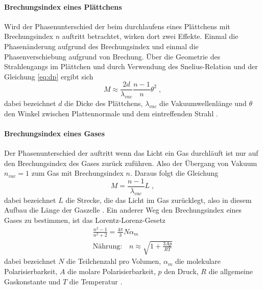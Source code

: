 \paragraph{Brechungsindex eines Plättchens}
Wird der Phasenunterschied der beim durchlaufens eines Plättchens mit Brechungsindex $n$ auftritt betrachtet,
wirken dort zwei Effekte. Einmal die Phasenänderung aufgrund des Brechungsindex und einmal die
Phasenverschiebung aufgrund von Brechung. Über die Geometrie des Strahlengangs im Plättchen und durch
Verwendung des Snelius-Relation und der Gleichung \eqref{eq:dp} ergibt sich
\begin{equation}
M \approx \frac{2d}{\lambda_{vac}} \frac{n-1}{n} \theta^2 \; ,
\label{eq:pM}
\end{equation}
dabei bezeichnet $d$ die Dicke des Plättchens, $\lambda_{vac}$ die Vakuumwellenlänge und $\theta$ den
Winkel zwischen Plattennormale und dem eintreffenden Strahl \cite{Anleitung}.
\paragraph{Brechungsindex eines Gases}
Der Phasenunterschied der auftritt wenn das Licht ein Gas durchläuft ist nur auf den Brechungsindex des
Gases zurück zuführen. Also der Übergang von Vakuum $n_{vac}= 1$ zum Gas mit Brechungsindex $n$. Daraus folgt
die Gleichung
\begin{equation}
M = \frac{n-1}{\lambda_{vac}} L \; ,
\label{eq:lM}
\end{equation}
dabei bezeichnet $L$ die Strecke, die das Licht im Gas zurücklegt, also in diesem Aufbau die Länge der Gaszelle
\cite{Anleitung}. Ein anderer Weg den Brechungsindex eines Gases zu bestimmen, ist das Lorentz-Lorenz-Gesetz
\begin{gather}
\frac{n^2 -1}{n^2 +2} = \frac{4\pi}{3} N \alpha_m \\
\text{Nährung:} \quad n \approx \sqrt{1+ \frac{3Ap}{RT}}
\label{eq:NLL}
\end{gather}
dabei bezeichnet $N$ die Teilchenzahl pro Volumen, $\alpha_m$ die molekulare Polarisierbarkeit, $A$ die
molare Polarisierbarkeit, $p$ den Druck, $R$ die allgemeine Gaskonstante und $T$ die Temperatur
\cite{LLG}.
